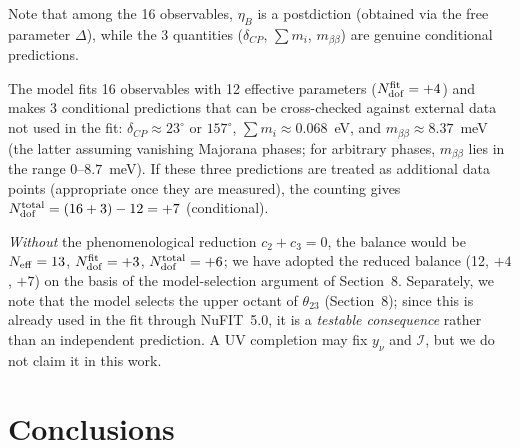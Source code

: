\documentclass[12pt,a4paper]{article}
\numberwithin{equation}{section}
\begin{document}
Note that among the 16 observables, \(\eta_B\) is a postdiction (obtained via the free parameter \(\Delta\)), while the 3 quantities (\(\delta_{CP}\), \(\sum m_i\), \(m_{\beta\beta}\)) are genuine conditional predictions.

The model fits 16 observables with 12 effective parameters
(\(N_{\rm dof}^{\rm fit} = +4\)) and makes 3 conditional predictions
that can be cross-checked against external data not used in the fit:
\(\delta_{CP} \approx 23^\circ\) or \(157^\circ\),
\(\sum m_i \approx 0.068\)~eV, and
\(m_{\beta\beta} \approx 8.37\)~meV (the latter assuming vanishing
Majorana phases; for arbitrary phases, \(m_{\beta\beta}\) lies in the
range \(0\)--\(8.7\)~meV). If these three predictions are treated as
additional data points (appropriate once they are measured), the
counting gives \(N_{\rm dof}^{\rm total} = (16+3) - 12 = +7\) (conditional).

\emph{Without} the phenomenological reduction \(c_2 + c_3 = 0\),
the balance would be \(N_{\rm eff} = 13\),
\(N_{\rm dof}^{\rm fit} = +3\), \(N_{\rm dof}^{\rm total} = +6\);
we have adopted the reduced balance
(12, \(+4\), \(+7\)) on the basis of the model-selection argument of
Section~8. Separately, we note that the model selects the upper
octant of \(\theta_{23}\) (Section~8); since this is already used in
the fit through NuFIT~5.0, it is a \emph{testable consequence} rather
than an independent prediction. A UV completion may fix \(y_\nu\) and
\(\mathcal{I}\), but we do not claim it in this work.

\section{Conclusions}
\end{document}
